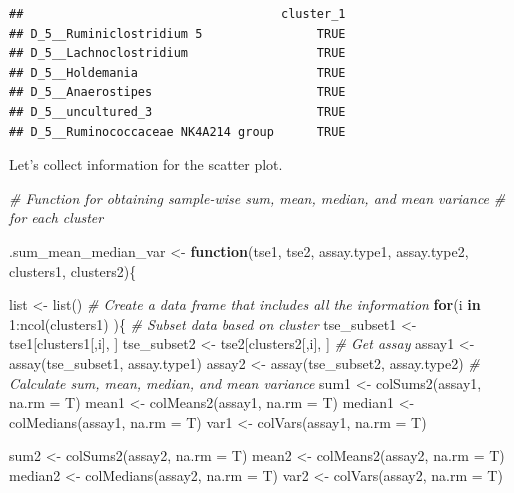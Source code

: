 \documentclass[
]{book}
\newenvironment{Shaded}{\begin{snugshade}}{\end{snugshade}}
\newcommand{\AttributeTok}[1]{\textcolor[rgb]{0.77,0.63,0.00}{#1}}
\newcommand{\CommentTok}[1]{\textcolor[rgb]{0.56,0.35,0.01}{\textit{#1}}}
\newcommand{\ControlFlowTok}[1]{\textcolor[rgb]{0.13,0.29,0.53}{\textbf{#1}}}
\newcommand{\DecValTok}[1]{\textcolor[rgb]{0.00,0.00,0.81}{#1}}
\newcommand{\FunctionTok}[1]{\textcolor[rgb]{0.00,0.00,0.00}{#1}}
\newcommand{\NormalTok}[1]{#1}
\newcommand{\OtherTok}[1]{\textcolor[rgb]{0.56,0.35,0.01}{#1}}
\newcommand{\SpecialCharTok}[1]{\textcolor[rgb]{0.00,0.00,0.00}{#1}}
\begin{document}
\begin{verbatim}
##                                    cluster_1
## D_5__Ruminiclostridium 5                TRUE
## D_5__Lachnoclostridium                  TRUE
## D_5__Holdemania                         TRUE
## D_5__Anaerostipes                       TRUE
## D_5__uncultured_3                       TRUE
## D_5__Ruminococcaceae NK4A214 group      TRUE
\end{verbatim}

Let's collect information for the scatter plot.

\begin{Shaded}
\begin{Highlighting}[]
\CommentTok{\# Function for obtaining sample{-}wise sum, mean, median, and mean variance}
\CommentTok{\# for each cluster}

\NormalTok{.sum\_mean\_median\_var }\OtherTok{\textless{}{-}} \ControlFlowTok{function}\NormalTok{(tse1, tse2, assay.type1, assay.type2, clusters1, clusters2)\{}
  
\NormalTok{  list }\OtherTok{\textless{}{-}} \FunctionTok{list}\NormalTok{()}
  \CommentTok{\# Create a data frame that includes all the information}
  \ControlFlowTok{for}\NormalTok{(i }\ControlFlowTok{in} \DecValTok{1}\SpecialCharTok{:}\FunctionTok{ncol}\NormalTok{(clusters1) )\{}
    \CommentTok{\# Subset data based on cluster}
\NormalTok{    tse\_subset1 }\OtherTok{\textless{}{-}}\NormalTok{ tse1[clusters1[,i], ]}
\NormalTok{    tse\_subset2 }\OtherTok{\textless{}{-}}\NormalTok{ tse2[clusters2[,i], ]}
    \CommentTok{\# Get assay}
\NormalTok{    assay1 }\OtherTok{\textless{}{-}} \FunctionTok{assay}\NormalTok{(tse\_subset1, assay.type1)}
\NormalTok{    assay2 }\OtherTok{\textless{}{-}} \FunctionTok{assay}\NormalTok{(tse\_subset2, assay.type2)}
    \CommentTok{\# Calculate sum, mean, median, and mean variance}
\NormalTok{    sum1 }\OtherTok{\textless{}{-}} \FunctionTok{colSums2}\NormalTok{(assay1, }\AttributeTok{na.rm =}\NormalTok{ T)}
\NormalTok{    mean1 }\OtherTok{\textless{}{-}} \FunctionTok{colMeans2}\NormalTok{(assay1, }\AttributeTok{na.rm =}\NormalTok{ T)}
\NormalTok{    median1 }\OtherTok{\textless{}{-}} \FunctionTok{colMedians}\NormalTok{(assay1, }\AttributeTok{na.rm =}\NormalTok{ T)}
\NormalTok{    var1 }\OtherTok{\textless{}{-}} \FunctionTok{colVars}\NormalTok{(assay1, }\AttributeTok{na.rm =}\NormalTok{ T)}
    
\NormalTok{    sum2 }\OtherTok{\textless{}{-}} \FunctionTok{colSums2}\NormalTok{(assay2, }\AttributeTok{na.rm =}\NormalTok{ T)}
\NormalTok{    mean2 }\OtherTok{\textless{}{-}} \FunctionTok{colMeans2}\NormalTok{(assay2, }\AttributeTok{na.rm =}\NormalTok{ T)}
\NormalTok{    median2 }\OtherTok{\textless{}{-}} \FunctionTok{colMedians}\NormalTok{(assay2, }\AttributeTok{na.rm =}\NormalTok{ T)}
\NormalTok{    var2 }\OtherTok{\textless{}{-}} \FunctionTok{colVars}\NormalTok{(assay2, }\AttributeTok{na.rm =}\NormalTok{ T)}
    

\end{Highlighting}
\end{Shaded}
\end{document}
